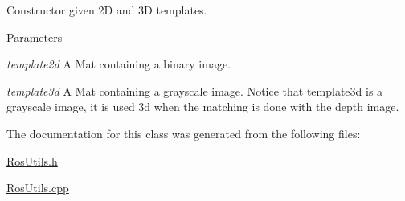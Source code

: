 \label{classRosUtils_aadb640f35f26394dfd6240b17c95c942}
Constructor given 2D and 3D templates. 
\begin{DoxyParams}{Parameters}
\item[{\em template2d}]A Mat containing a binary image. \item[{\em template3d}]A Mat containing a grayscale image. Notice that template3d is a grayscale image, it is used 3d when the matching is done with the depth image. \end{DoxyParams}


The documentation for this class was generated from the following files:\begin{DoxyCompactItemize}
\item 
\hyperlink{RosUtils_8h}{RosUtils.h}\item 
\hyperlink{RosUtils_8cpp}{RosUtils.cpp}\end{DoxyCompactItemize}
